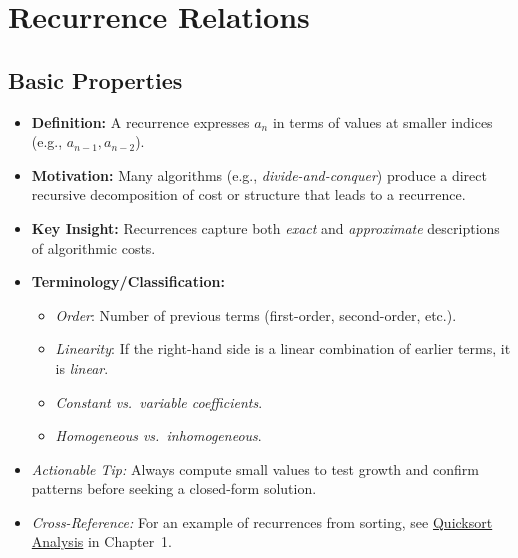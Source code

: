 \documentclass[11pt,letterpaper]{article}
\begin{document}
\section{Recurrence Relations}

\subsection{Basic Properties}
\begin{itemize}
  \item \textbf{Definition:} A recurrence expresses \(a_n\) in terms of values at smaller indices (e.g., \(a_{n-1}, a_{n-2}\)).
  \item \textbf{Motivation:} Many algorithms (e.g., \emph{divide-and-conquer}) produce a direct recursive decomposition of cost or structure that leads to a recurrence.
  \item \textbf{Key Insight:} Recurrences capture both \emph{exact} and \emph{approximate} descriptions of algorithmic costs.
  \item \textbf{Terminology/Classification:}
  \begin{itemize}
    \item \emph{Order}: Number of previous terms (first-order, second-order, etc.).
    \item \emph{Linearity}: If the right-hand side is a linear combination of earlier terms, it is \emph{linear}.
    \item \emph{Constant vs.\ variable coefficients}.
    \item \emph{Homogeneous vs.\ inhomogeneous}.
  \end{itemize}
  \item \emph{Actionable Tip:} Always compute small values to test growth and confirm patterns before seeking a closed-form solution.
  \item \emph{Cross-Reference:} For an example of recurrences from sorting, see \hyperref[quicksort-proof]{Quicksort Analysis} in Chapter~1.
\end{itemize}

\end{document}
